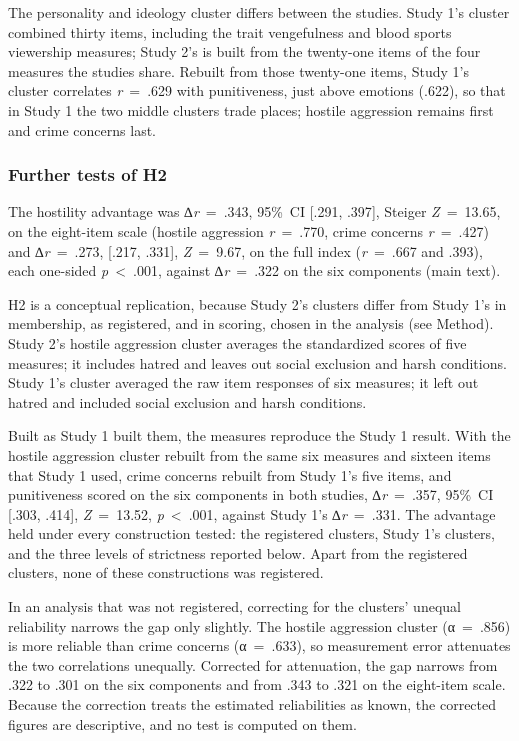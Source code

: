 The personality and ideology cluster differs between the studies. Study 1's cluster combined thirty items, including the trait vengefulness and blood sports viewership measures; Study 2's is built from the twenty-one items of the four measures the studies share. Rebuilt from those twenty-one items, Study 1's cluster correlates \emph{r}~=~.629 with punitiveness, just above emotions (.622), so that in Study 1 the two middle clusters trade places; hostile aggression remains first and crime concerns last.

\subsubsection{Further tests of H2}\label{further-tests-of-h2}

The hostility advantage was ∆\emph{r}~=~.343, 95\%~CI {[}.291, .397{]}, Steiger \emph{Z}~=~13.65, on the eight-item scale (hostile aggression \emph{r}~=~.770, crime concerns \emph{r}~=~.427) and ∆\emph{r}~=~.273, {[}.217, .331{]}, \emph{Z}~=~9.67, on the full index (\emph{r}~=~.667 and .393), each one-sided \emph{p}~\textless{}~.001, against ∆\emph{r}~=~.322 on the six components (main text).

H2 is a conceptual replication, because Study 2's clusters differ from Study 1's in membership, as registered, and in scoring, chosen in the analysis (see Method). Study 2's hostile aggression cluster averages the standardized scores of five measures; it includes hatred and leaves out social exclusion and harsh conditions. Study 1's cluster averaged the raw item responses of six measures; it left out hatred and included social exclusion and harsh conditions.

Built as Study 1 built them, the measures reproduce the Study 1 result. With the hostile aggression cluster rebuilt from the same six measures and sixteen items that Study 1 used, crime concerns rebuilt from Study 1's five items, and punitiveness scored on the six components in both studies, ∆\emph{r}~=~.357, 95\%~CI {[}.303, .414{]}, \emph{Z}~=~13.52, \emph{p}~\textless{}~.001, against Study 1's ∆\emph{r}~=~.331. The advantage held under every construction tested: the registered clusters, Study 1's clusters, and the three levels of strictness reported below. Apart from the registered clusters, none of these constructions was registered.

In an analysis that was not registered, correcting for the clusters' unequal reliability narrows the gap only slightly. The hostile aggression cluster (α~=~.856) is more reliable than crime concerns (α~=~.633), so measurement error attenuates the two correlations unequally. Corrected for attenuation, the gap narrows from .322 to .301 on the six components and from .343 to .321 on the eight-item scale. Because the correction treats the estimated reliabilities as known, the corrected figures are descriptive, and no test is computed on them.

